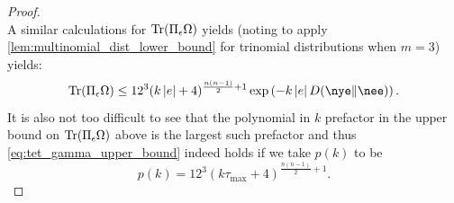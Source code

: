 \documentclass[notitlepage, 10pt]{article}
\begin{document}
\begin{proof}
\begin{equation}
    \end{equation}
    A similar calculations for $\operatorname{Tr}(\Pi_{\epsilon} \Omega)$ yields (noting to apply \cref{lem:multinomial_dist_lower_bound} for trinomial distributions when $m=3$) yields:
    \begin{equation}
        \Tr(\Pi_{\ye} \Omega) \leq 12^{3}(k\abs{\ee}+4)^{\frac{n(n-1)}{2}+1}\exp\left(-k\abs{\ee}\kl{\nye}{\nee}\right).
    \end{equation}
    It is also not too difficult to see that the polynomial in $k$ prefactor in the upper bound on $\operatorname{Tr}(\Pi_{\epsilon} \Omega)$ above is the largest such prefactor and thus \cref{eq:tet_gamma_upper_bound} indeed holds if we take $p(k)$ to be
    \begin{equation}
        \label{eq:p_of_k}
        p(k) = 12^{3}(k\tau_{\max}+4)^{\frac{n(n-1)}{2}+1}.
    \end{equation}
\end{proof}
\end{document}
